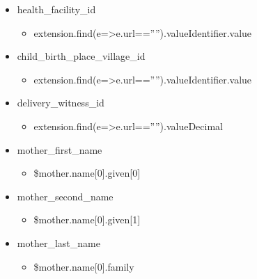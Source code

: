 \documentclass[letterpaper,10pt,english]{sphinxmanual}
\begin{document}
\begin{itemize}
\begin{itemize}
\end{itemize}

\item {} 
\sphinxAtStartPar
health\_facility\_id
\begin{itemize}
\item {} 
\sphinxAtStartPar
extension.find(e=\textgreater{}e.url==””).valueIdentifier.value

\end{itemize}

\item {} 
\sphinxAtStartPar
child\_birth\_place\_village\_id
\begin{itemize}
\item {} 
\sphinxAtStartPar
extension.find(e=\textgreater{}e.url==””).valueIdentifier.value

\end{itemize}

\item {} 
\sphinxAtStartPar
delivery\_witness\_id
\begin{itemize}
\item {} 
\sphinxAtStartPar
extension.find(e=\textgreater{}e.url==””).valueDecimal

\end{itemize}

\item {} 
\sphinxAtStartPar
mother\_first\_name
\begin{itemize}
\item {} 
\sphinxAtStartPar
\$mother.name{[}0{]}.given{[}0{]}

\end{itemize}

\item {} 
\sphinxAtStartPar
mother\_second\_name
\begin{itemize}
\item {} 
\sphinxAtStartPar
\$mother.name{[}0{]}.given{[}1{]}

\end{itemize}

\item {} 
\sphinxAtStartPar
mother\_last\_name
\begin{itemize}
\item {} 
\sphinxAtStartPar
\$mother.name{[}0{]}.family


\end{itemize}
\end{itemize}
\end{document}
